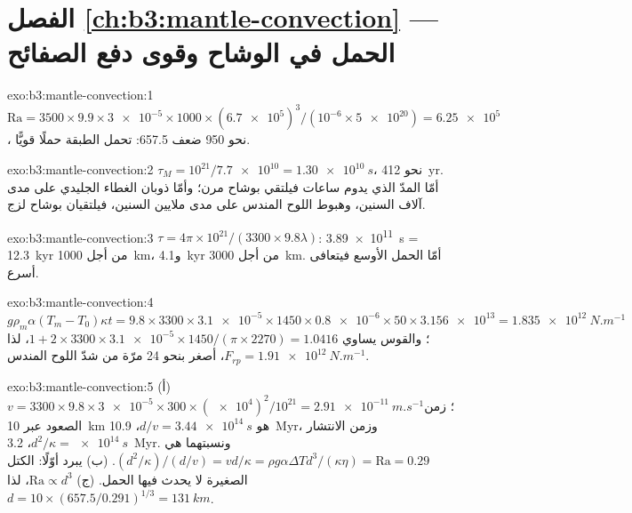 \section*{الفصل \ref{ch:b3:mantle-convection} --- الحمل في الوشاح وقوى دفع الصفائح}

\begin{solution}{exo:b3:mantle-convection:1}
$\mathrm{Ra} = 3500\times9.9\times\num{3e-5}\times1000\times(\num{6.7e5})^3/
(10^{-6}\times\num{5e20}) = \num{6.25e5}$، نحو 950 ضعف 
657.5: تحمل الطبقة حملًا قويًّا.
\end{solution}

\begin{solution}{exo:b3:mantle-convection:2}
$\tau_M = 10^{21}/\num{7.7e10} = \qty{1.30e10}{s}$، نحو \qty{412}{yr}. أمّا المدّ
الذي يدوم ساعات فيلتقي بوشاح مرن؛ وأمّا ذوبان الغطاء الجليدي
على مدى آلاف السنين، وهبوط اللوح المندس على مدى ملايين السنين، فيلتقيان
بوشاح لزج.
\end{solution}

\begin{solution}{exo:b3:mantle-convection:3}
$\tau = 4\pi\times10^{21}/(3300\times9.8\lambda)$: \qty{3.89e11}{s} =
\qty{12.3}{kyr} من أجل \qty{1000}{km}، و\qty{4.1}{kyr} من أجل \qty{3000}{km}. أمّا الحمل
الأوسع فيتعافى أسرع.
\end{solution}

\begin{solution}{exo:b3:mantle-convection:4}
$g\rho_m\alpha(T_m - T_0)\kappa t = 9.8\times3300\times\num{3.1e-5}\times1450
\times\num{0.8e-6}\times50\times\num{3.156e13} = \qty{1.835e12}{N.m^{-1}}$؛ والقوس
يساوي $1 + 2\times3300\times\num{3.1e-5}\times1450/(\pi\times2270) = 1.0416$، لذا
$F_{rp} = \qty{1.91e12}{N.m^{-1}}$، أصغر بنحو 24 مرّة من شدّ اللوح المندس.
\end{solution}

\begin{solution}{exo:b3:mantle-convection:5}
(أ) $v = 3300\times9.8\times\num{3e-5}\times300\times(\num{e4})^2/10^{21} =
\qty{2.91e-11}{m.s^{-1}}$؛ زمن الصعود عبر \qty{10}{km} هو $d/v =
\qty{3.44e14}{s}$، \qty{10.9}{Myr}، وزمن الانتشار $d^2/\kappa =
\qty{e14}{s}$، \qty{3.2}{Myr}. ونسبتهما هي $(d^2/\kappa)/(d/v) =
vd/\kappa = \rho g\alpha\Delta Td^3/(\kappa\eta) = \mathrm{Ra} = 0.29$. (ب) يبرد
أوّلًا: الكتل الصغيرة لا يحدث فيها الحمل. (ج) $\mathrm{Ra} \propto d^3$، لذا $d =
10\times(657.5/0.291)^{1/3} = \qty{131}{km}$.
\end{solution}

